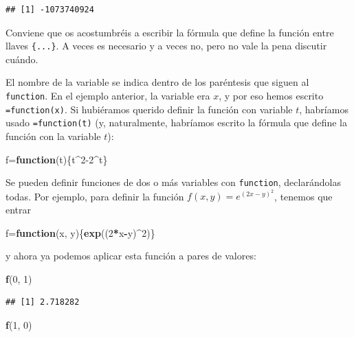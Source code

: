 \documentclass[]{book}
\newenvironment{Shaded}{\begin{snugshade}}{\end{snugshade}}
\newcommand{\ControlFlowTok}[1]{\textcolor[rgb]{0.13,0.29,0.53}{\textbf{#1}}}
\newcommand{\DecValTok}[1]{\textcolor[rgb]{0.00,0.00,0.81}{#1}}
\newcommand{\KeywordTok}[1]{\textcolor[rgb]{0.13,0.29,0.53}{\textbf{#1}}}
\newcommand{\NormalTok}[1]{#1}
\newcommand{\OperatorTok}[1]{\textcolor[rgb]{0.81,0.36,0.00}{\textbf{#1}}}
\theoremstyle{definition}
\theoremstyle{definition}
\theoremstyle{definition}
\theoremstyle{remark}
\begin{document}
\begin{verbatim}
## [1] -1073740924
\end{verbatim}

Conviene que os acostumbréis a escribir la fórmula que define la función entre llaves \texttt{\{...\}}. A veces es necesario y a veces no, pero no vale la pena discutir cuándo.

El nombre de la variable se indica dentro de los paréntesis que siguen al \texttt{function}. En el ejemplo anterior, la variable era \(x\), y por eso hemos escrito \texttt{=function(x)}. Si hubiéramos querido definir la función con variable \(t\), habríamos usado \texttt{=function(t)} (y, naturalmente, habríamos escrito la fórmula que define la función con la variable \(t\)):

\begin{Shaded}
\begin{Highlighting}[]
\NormalTok{f=}\ControlFlowTok{function}\NormalTok{(t)\{t}\OperatorTok{^}\DecValTok{2-2}\OperatorTok{^}\NormalTok{t\}}
\end{Highlighting}
\end{Shaded}

Se pueden definir funciones de dos o más variables con \texttt{function}, declarándolas todas. Por ejemplo, para definir la función \(f(x,y)=e^{(2x-y)^2}\), tenemos que entrar

\begin{Shaded}
\begin{Highlighting}[]
\NormalTok{f=}\ControlFlowTok{function}\NormalTok{(x, y)\{}\KeywordTok{exp}\NormalTok{((}\DecValTok{2}\OperatorTok{*}\NormalTok{x}\OperatorTok{-}\NormalTok{y)}\OperatorTok{^}\DecValTok{2}\NormalTok{)\}}
\end{Highlighting}
\end{Shaded}

y ahora ya podemos aplicar esta función a pares de valores:

\begin{Shaded}
\begin{Highlighting}[]
\KeywordTok{f}\NormalTok{(}\DecValTok{0}\NormalTok{, }\DecValTok{1}\NormalTok{)}
\end{Highlighting}
\end{Shaded}

\begin{verbatim}
## [1] 2.718282
\end{verbatim}

\begin{Shaded}
\begin{Highlighting}[]
\KeywordTok{f}\NormalTok{(}\DecValTok{1}\NormalTok{, }\DecValTok{0}\NormalTok{)}
\end{Highlighting}
\end{Shaded}
\end{document}

